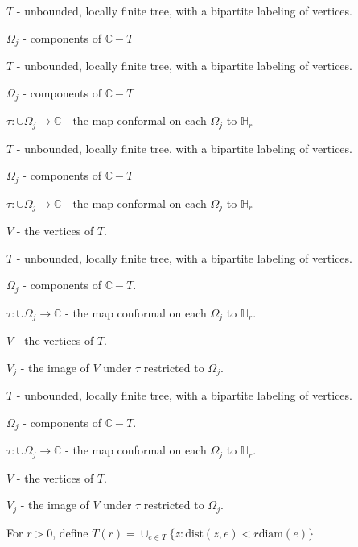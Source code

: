 \documentclass{beamer}
\begin{document}
\begin{frame}

$T$ - unbounded, locally finite tree, with a bipartite labeling of vertices.

$\Omega_j$ - components of $\mathbb{C}-T$

\end{frame}



\begin{frame}

$T$ - unbounded, locally finite tree, with a bipartite labeling of vertices.

$\Omega_j$ - components of $\mathbb{C}-T$

$\tau: \cup \Omega_j \rightarrow \mathbb{C}$ - the map conformal on each $\Omega_j$ to $\mathbb{H}_r$

\end{frame}




\begin{frame}

$T$ - unbounded, locally finite tree, with a bipartite labeling of vertices.

$\Omega_j$ - components of $\mathbb{C}-T$

$\tau: \cup \Omega_j \rightarrow \mathbb{C}$ - the map conformal on each $\Omega_j$ to $\mathbb{H}_r$

$V$ - the vertices of $T$. 

\end{frame}





\begin{frame}

$T$ - unbounded, locally finite tree, with a bipartite labeling of vertices.

$\Omega_j$ - components of $\mathbb{C}-T$.

$\tau: \cup \Omega_j \rightarrow \mathbb{C}$ - the map conformal on each $\Omega_j$ to $\mathbb{H}_r$.

$V$ - the vertices of $T$. 

$V_j$ - the image of $V$ under $\tau$ restricted to $\Omega_j$.

\end{frame}



\begin{frame}

$T$ - unbounded, locally finite tree, with a bipartite labeling of vertices.

$\Omega_j$ - components of $\mathbb{C}-T$.

$\tau: \cup \Omega_j \rightarrow \mathbb{C}$ - the map conformal on each $\Omega_j$ to $\mathbb{H}_r$.

$V$ - the vertices of $T$. 

$V_j$ - the image of $V$ under $\tau$ restricted to $\Omega_j$.

For $r > 0$, define $T(r) = \cup_{e\in T} \{z : \textrm{dist}(z,e) < r\textrm{diam}(e) \}$

\end{frame}
\end{document}
